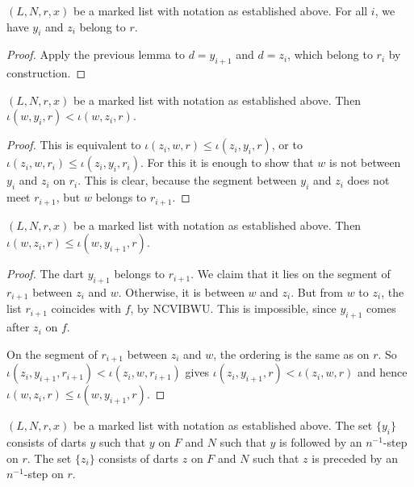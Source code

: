 \begin{lemma}
$(L,N,r,x)$ be a marked list with notation as established above.
For all $i$, we have $y_i$ and $z_i$ belong to $r$.
\end{lemma}

\begin{proof}
Apply the previous lemma to $d = y_{i+1}$ and $d=z_i$, which belong to $r_i$ by construction.
\end{proof}

\begin{lemma}
$(L,N,r,x)$ be a marked list with notation as established above.
Then $\iota(w,y_i,r) < \iota(w,z_i,r)$.
\end{lemma}

\begin{proof}
This is equivalent to $\iota(z_i,w,r) \le \iota(z_i,y_i,r)$,  or to $\iota(z_i,w,r_i)\le \iota(z_i,y_i,r_i)$. 
For this it is enough to show that $w$ is not between $y_i$ and $z_i$ on $r_i$.  This is clear,
because the segment between $y_i$ and $z_i$ does not meet $r_{i+1}$, but $w$ belongs to $r_{i+1}$.
\end{proof}

\begin{lemma}
$(L,N,r,x)$ be a marked list with notation as established above.
Then $\iota(w,z_i,r) \le \iota(w,y_{i+1},r)$.
\end{lemma}

\begin{proof}  
The dart $y_{i+1}$ belongs to $r_{i+1}$.  We claim that it lies on the segment of $r_{i+1}$ between $z_i$ and $w$.
Otherwise, it is between $w$ and $z_i$.  But from $w$ to $z_i$, the list $r_{i+1}$ coincides with $f$, by NCVIBWU.  This is impossible,
since $y_{i+1}$ comes after $z_i$ on $f$.

On the segment of $r_{i+1}$ between $z_i$ and $w$, the ordering is the same as on $r$.
So $\iota(z_i,y_{i+1},r_{i+1}) < \iota(z_i,w,r_{i+1})$ gives $\iota(z_i,y_{i+1},r) < \iota(z_i,w,r)$ and hence
$\iota(w,z_i,r) \le \iota(w,y_{i+1},r)$.
\end{proof}

\begin{lemma} 
$(L,N,r,x)$ be a marked list with notation as established above.
The set $\{y_i\}$ consists of darts $y$ such that
$y$ on $F$ and $N$ such that $y$ is followed by an 
$n^{-1}$-step on $r$.
The set $\{z_i\}$ consists of darts $z$ on $F$ and $N$ such that
$z$ is preceded by an $n^{-1}$-step on $r$.
\end{lemma} 

